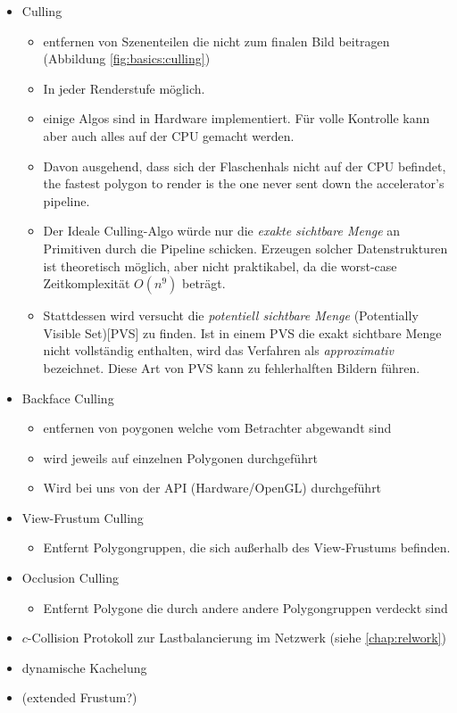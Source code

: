 \begin{itemize}
  \item Culling \cite{RTR3}\label{sec:basics:algos:culling}
  \begin{itemize}
    \item entfernen von Szenenteilen die nicht zum finalen Bild beitragen (Abbildung \ref{fig:basics:culling})
    \item In jeder Renderstufe möglich.
    \item einige Algos sind in Hardware implementiert. Für volle Kontrolle kann aber auch alles auf der CPU gemacht werden.
    \item Davon ausgehend, dass sich der Flaschenhals nicht auf der CPU befindet, the fastest polygon to render is the one never sent down the accelerator's pipeline.
    \item Der Ideale Culling-Algo würde nur die \textit{exakte sichtbare Menge} an Primitiven durch die Pipeline schicken. Erzeugen solcher Datenstrukturen ist theoretisch möglich, aber nicht praktikabel, da die worst-case Zeitkomplexität $O(n^{9})$ \cite{culling} beträgt.
    \item Stattdessen wird versucht die \textit{potentiell sichtbare Menge} (Potentially Visible Set)[PVS] zu finden. Ist in einem PVS die exakt sichtbare Menge nicht vollständig enthalten, wird das Verfahren als \textit{approximativ} bezeichnet. Diese Art von PVS kann zu fehlerhalften Bildern führen.
  \end{itemize}
  \item Backface Culling
  \begin{itemize}
    \item entfernen von poygonen welche vom Betrachter abgewandt sind
    \item wird jeweils auf einzelnen Polygonen durchgeführt
    \item Wird bei uns von der API (Hardware/OpenGL) durchgeführt
  \end{itemize}
  \item View-Frustum Culling \cite{RTR3} \label{sec:basics:algos:frustumculling}
  \begin{itemize}
    \item Entfernt Polygongruppen, die sich außerhalb des View-Frustums befinden.
  \end{itemize}
  \item Occlusion Culling \cite{RTR3}\label{sec:basics:algos:occlusionculling}
  \begin{itemize}
    \item Entfernt Polygone die durch andere andere Polygongruppen verdeckt sind
  \end{itemize}
  \item $c$-Collision Protokoll zur Lastbalancierung im Netzwerk \label{sec:basics:algos:ccollision} (siehe \ref{chap:relwork})
  \item dynamische Kachelung
  \item (extended Frustum?)
\end{itemize}

